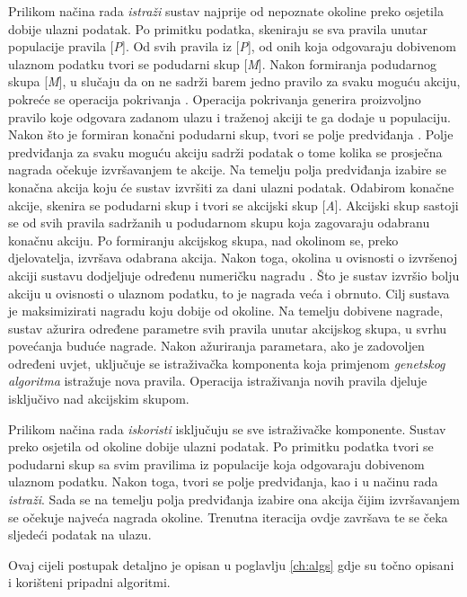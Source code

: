 \documentclass[times, utf8, zavrsni]{fer}
\begin{document}
Prilikom načina rada \emph{istraži} sustav najprije od nepoznate okoline preko osjetila dobije ulazni podatak.
Po primitku podatka, skeniraju se sva pravila unutar populacije pravila [\emph{P}].
Od svih pravila iz [\emph{P}], od onih koja odgovaraju dobivenom ulaznom podatku tvori se podudarni skup  [\emph{M}].
Nakon formiranja podudarnog skupa [\emph{M}], u slučaju da on ne sadrži barem jedno pravilo za svaku moguću akciju, pokreće se operacija pokrivanja .
Operacija pokrivanja generira proizvoljno pravilo koje odgovara zadanom ulazu i traženoj akciji te ga dodaje u populaciju.
Nakon što je formiran konačni podudarni skup, tvori se polje predviđanja .
Polje predviđanja za svaku moguću akciju sadrži podatak o tome kolika se prosječna nagrada očekuje izvršavanjem te akcije.
Na temelju polja predviđanja izabire se konačna akcija koju će sustav izvršiti za dani ulazni podatak.
Odabirom konačne akcije, skenira se podudarni skup i tvori se akcijski skup  [\emph{A}].
Akcijski skup sastoji se od svih pravila sadržanih u podudarnom skupu koja zagovaraju odabranu konačnu akciju.
Po formiranju akcijskog skupa, nad okolinom se, preko djelovatelja, izvršava odabrana akcija.
Nakon toga, okolina u ovisnosti o izvršenoj akciji sustavu dodjeljuje određenu numeričku nagradu .
Što je sustav izvršio bolju akciju u ovisnosti o ulaznom podatku, to je nagrada veća i obrnuto.
Cilj sustava je maksimizirati nagradu koju dobije od okoline.
Na temelju dobivene nagrade, sustav ažurira određene parametre svih pravila unutar akcijskog skupa, u svrhu povećanja buduće nagrade.
Nakon ažuriranja parametara, ako je zadovoljen određeni uvjet, uključuje se istraživačka komponenta koja primjenom \emph{genetskog algoritma} istražuje nova pravila.
Operacija istraživanja novih pravila djeluje isključivo nad akcijskim skupom.

Prilikom načina rada \emph{iskoristi} isključuju se sve istraživačke komponente.
Sustav preko osjetila od okoline dobije ulazni podatak.
Po primitku podatka tvori se podudarni skup sa svim pravilima iz populacije koja odgovaraju dobivenom ulaznom podatku.
Nakon toga, tvori se polje predviđanja, kao i u načinu rada \emph{istraži}.
Sada se na temelju polja predviđanja izabire ona akcija čijim izvršavanjem se očekuje najveća nagrada okoline.
Trenutna iteracija ovdje završava te se čeka sljedeći podatak na ulazu.

Ovaj cijeli postupak detaljno je opisan u poglavlju \ref{ch:algs} gdje su točno opisani i korišteni pripadni algoritmi.
\end{document}
